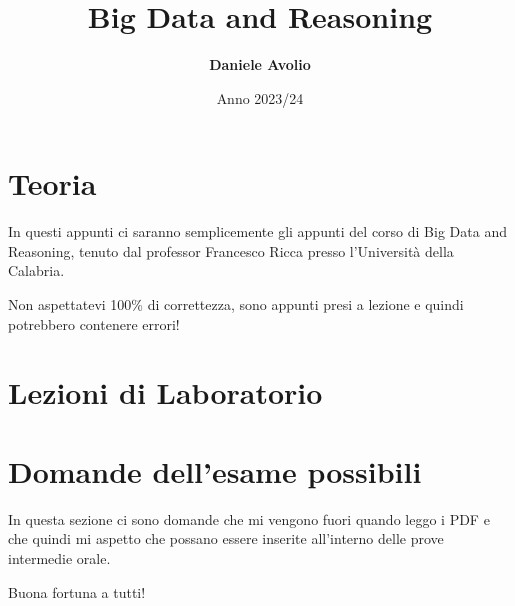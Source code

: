 \documentclass{article}
\title{\color{custompurple}\Huge Big Data and Reasoning}
\author{\textbf{Daniele Avolio}}
\date{Anno 2023/24}
\begin{document}
\maketitle
\newpage

\tableofcontents

\newpage
\section{Teoria}
In questi appunti ci saranno semplicemente gli appunti del corso di Big Data and Reasoning, tenuto dal professor Francesco Ricca presso l'Università della Calabria.

Non aspettatevi 100\% di correttezza, sono appunti presi a lezione e quindi potrebbero contenere errori!


\newpage

\newpage
\section{Lezioni di Laboratorio}

\newpage

\section*{Domande dell'esame possibili}
In questa sezione ci sono domande che mi vengono fuori quando 
leggo i PDF e che quindi mi aspetto che possano essere 
inserite all'interno delle prove intermedie \/ orale.

Buona fortuna a tutti!

\newpage



\end{document}
